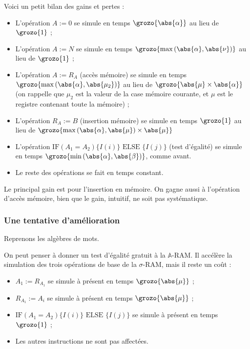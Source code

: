 \documentclass{report}
\newcommand{\sRAMifc}[2]{\text{IF} (A_1=A_2) \{I( #1 )\} \text{ ELSE } \{I( #2 )\}}
\newcommand{\bbA}{\mathbb{A}}
\begin{document}
				Voici un petit bilan des gains et pertes :
				\begin{itemize}[itemsep=-1mm]
					\item 	L'opération $A:=0$ se simule en temps $\grozo{\abs{\alpha}}$ au lieu de $\grozo{1}$ ;
					\item 	L'opération $A:=N$ se simule en temps $\grozo{\max\left( \abs{\alpha}, \abs{\nu} \right)}$ au lieu de $\grozo{1}$ ;
					\item 	L'opération $A:=R_A$ (accès mémoire) se simule en temps $\grozo{\max\left( \abs{\alpha}, \abs{\mu_2} \right)}$ au lieu de $\grozo{\abs{\mu} \times \abs{\alpha}}$ (on rappelle que $\mu_2$ est la valeur de la case mémoire courante, et $\mu$ est le registre contenant toute la mémoire) ;
					\item 	L'opération $R_A:=B$ (insertion mémoire) se simule en temps  $\grozo{1}$ au lieu de $\grozo{\max\left( \abs{\alpha}, \abs{\mu} \right)\times \abs{\mu}}$
					\item 	L'opération $\sRAMifc{i}{j}$ (test d'égalité) se simule en temps $\grozo{\min\left( \abs{\alpha} , \abs{\beta} \right)}$, comme avant.
					\item 	Le reste des opérations se fait en temps constant.
				\end{itemize}
				
				Le principal gain est pour l'insertion en mémoire. On gagne aussi à l'opération d'accès mémoire, bien que le gain, intuitif, ne soit pas systématique. 
	
	
			\subsubsection{Une tentative d'amélioration}
			\label{subsubsec:sim_amelioration}
				
				Reprenons les algèbres de mots.
				
				On peut penser à donner un test d'égalité gratuit à la $\bbA$-RAM. Il accélère la simulation des trois opérations de base de la $\sigma$-RAM, mais il reste un coût : 
				
				\begin{itemize}[itemsep=-1mm]
					\item 	$A_1 := R_{A_1}$ se simule à présent en temps $\grozo{\abs{\mu}}$ ;
					\item 	$R_{A_1} := A_i$ se simule à présent en temps $\grozo{\abs{\mu}}$ ;
					\item 	$\sRAMifc{i}{j}$ se simule à présent en temps $\grozo{1}$ ;
					\item 	Les autres instructions ne sont pas affectées.
				\end{itemize}
				
\end{document}
